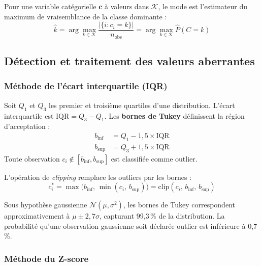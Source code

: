 \documentclass[12pt,a4paper]{article}
\newcounter{defcount}[section]
\newenvironment{definition}[1]{%
  \stepcounter{defcount}%
  \begin{tcolorbox}[defstyle={Définition \thesection.\thedefcount\ — #1}]
}{%
  \end{tcolorbox}
}
\newenvironment{remarque}[1]{%
  \begin{tcolorbox}[remarkstyle={Remarque — #1}]
}{%
  \end{tcolorbox}
}
\begin{document}
Pour une variable catégorielle $\mathbf{c}$ à valeurs dans $\mathcal{K}$, le mode
est l'estimateur du maximum de vraisemblance de la classe dominante :
\begin{equation}
  \hat{k} = \arg\max_{k \in \mathcal{K}} \frac{|\{i : c_i = k\}|}{n_{\text{obs}}}
  = \arg\max_{k \in \mathcal{K}} \hat{P}(C = k)
\end{equation}

\subsection{Détection et traitement des valeurs aberrantes}

\subsubsection{Méthode de l'écart interquartile (IQR)}

\begin{definition}{Bornes de Tukey}
Soit $Q_1$ et $Q_3$ les premier et troisième quartiles d'une distribution.
L'écart interquartile est $\text{IQR} = Q_3 - Q_1$. Les \textbf{bornes de Tukey}
définissent la région d'acceptation :
\begin{align}
  b_{\text{inf}} &= Q_1 - 1{,}5 \times \text{IQR} \\
  b_{\text{sup}} &= Q_3 + 1{,}5 \times \text{IQR}
\end{align}
Toute observation $c_i \notin [b_{\text{inf}}, b_{\text{sup}}]$ est classifiée comme
outlier.
\end{definition}

L'opération de \textit{clipping} remplace les outliers par les bornes :
\begin{equation}
  c_i^* = \max\!\bigl(b_{\text{inf}},\, \min(c_i,\, b_{\text{sup}})\bigr)
  = \text{clip}(c_i,\, b_{\text{inf}},\, b_{\text{sup}})
\end{equation}

\begin{remarque}{Justification statistique du facteur 1,5}
Sous hypothèse gaussienne $\mathcal{N}(\mu, \sigma^2)$, les bornes de Tukey
correspondent approximativement à $\mu \pm 2{,}7\sigma$, capturant 99{,}3\,\% de
la distribution. La probabilité qu'une observation gaussienne soit
déclarée outlier est inférieure à 0,7\,\%.
\end{remarque}

\subsubsection{Méthode du Z-score}
\end{document}

